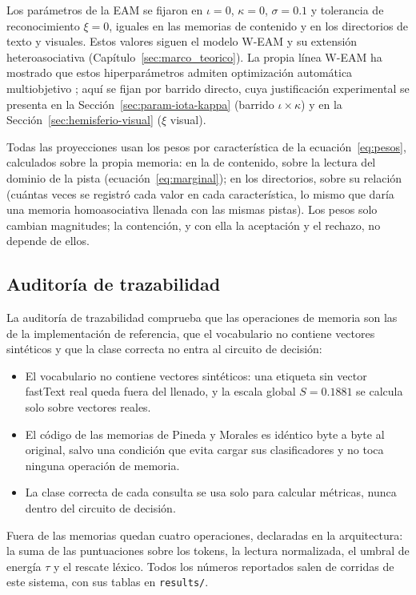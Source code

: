 Los parámetros de la EAM se fijaron en $\iota = 0$, $\kappa = 0$, $\sigma = 0.1$ y
tolerancia de reconocimiento $\xi = 0$, iguales en las memorias de contenido y en los
directorios de texto y visuales.
Estos valores siguen el modelo W-EAM y su extensión heteroasociativa
(Capítulo~\ref{sec:marco_teorico}).
La propia línea W-EAM ha mostrado que estos hiperparámetros admiten optimización
automática multiobjetivo \cite{lopez2025hyperopt}; aquí se fijan por barrido directo,
cuya justificación experimental se presenta en la Sección~\ref{sec:param-iota-kappa}
(barrido $\iota \times \kappa$) y en la Sección~\ref{sec:hemisferio-visual}
($\xi$ visual).

Todas las proyecciones usan los pesos por característica de la ecuación~\eqref{eq:pesos},
calculados sobre la propia memoria: en la de contenido, sobre la lectura del dominio de
la pista (ecuación~\eqref{eq:marginal}); en los directorios, sobre su relación (cuántas
veces se registró cada valor en cada característica, lo mismo que daría una memoria
homoasociativa llenada con las mismas pistas).
Los pesos solo cambian magnitudes; la contención, y con ella la aceptación y el rechazo,
no depende de ellos.

\subsection{Auditoría de trazabilidad}
\label{sec:auditoria}

La auditoría de trazabilidad comprueba que las operaciones de memoria son las de la
implementación de referencia, que el vocabulario no contiene vectores sintéticos y que
la clase correcta no entra al circuito de decisión:
\begin{itemize}
    \item El vocabulario no contiene vectores sintéticos: una etiqueta sin vector fastText
    real queda fuera del llenado, y la escala global $S = 0.1881$ se calcula solo sobre
    vectores reales.
    \item El código de las memorias de Pineda y Morales es idéntico byte a byte al
    original, salvo una condición que evita cargar sus clasificadores y no toca ninguna
    operación de memoria.
    \item La clase correcta de cada consulta se usa solo para calcular métricas, nunca
    dentro del circuito de decisión.
\end{itemize}
Fuera de las memorias quedan cuatro operaciones, declaradas en la arquitectura: la suma
de las puntuaciones sobre los tokens, la lectura normalizada, el umbral de energía $\tau$
y el rescate léxico.
Todos los números reportados salen de corridas de este sistema, con sus tablas en
\texttt{results/}.

